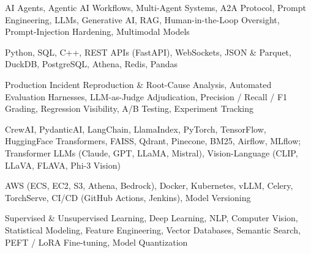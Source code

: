 \documentclass[letter,10pt]{article}
\begin{document}
 AI Agents, Agentic AI Workflows, Multi-Agent Systems, A2A Protocol, Prompt Engineering, LLMs, Generative AI, RAG, Human-in-the-Loop Oversight, Prompt-Injection Hardening, Multimodal Models\par\vspace{2pt}

 Python, SQL, C++, REST APIs (FastAPI), WebSockets, JSON \& Parquet, DuckDB, PostgreSQL, Athena, Redis, Pandas\par\vspace{2pt}

 Production Incident Reproduction \& Root-Cause Analysis, Automated Evaluation Harnesses, LLM-as-Judge Adjudication, Precision / Recall / F1 Grading, Regression Visibility, A/B Testing, Experiment Tracking\par\vspace{2pt}

 CrewAI, PydanticAI, LangChain, LlamaIndex, PyTorch, TensorFlow, HuggingFace Transformers, FAISS, Qdrant, Pinecone, BM25, Airflow, MLflow; Transformer LLMs (Claude, GPT, LLaMA, Mistral), Vision-Language (CLIP, LLaVA, FLAVA, Phi-3 Vision)\par\vspace{2pt}

 AWS (ECS, EC2, S3, Athena, Bedrock), Docker, Kubernetes, vLLM, Celery, TorchServe, CI/CD (GitHub Actions, Jenkins), Model Versioning\par\vspace{2pt}

 Supervised \& Unsupervised Learning, Deep Learning, NLP, Computer Vision, Statistical Modeling, Feature Engineering, Vector Databases, Semantic Search, PEFT / LoRA Fine-tuning, Model Quantization
\end{document}
